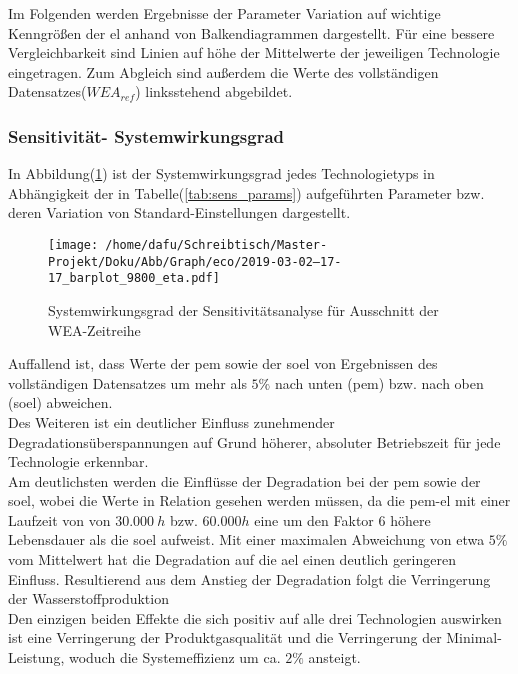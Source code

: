 \documentclass[onecolumn,10pt,titlepage]{article}
\begin{document}
Im Folgenden werden Ergebnisse der Parameter Variation auf wichtige Kenngrößen der \gls{el} anhand von Balkendiagrammen dargestellt. Für eine bessere Vergleichbarkeit sind Linien auf höhe der Mittelwerte der jeweiligen Technologie eingetragen.
Zum Abgleich sind außerdem die Werte des vollständigen Datensatzes($WEA_{ref}$) linksstehend abgebildet.

\newpage
\subsubsection{Sensitivität- Systemwirkungsgrad}
In Abbildung(\ref{fig:barplot_eco_9800_eta}) ist der Systemwirkungsgrad jedes Technologietyps in Abhängigkeit der in Tabelle(\ref{tab:sens_params}) aufgeführten Parameter bzw. deren Variation von Standard-Einstellungen dargestellt.\\


\begin{figure}[H]
	\centering
	\texttt{[image: /home/dafu/Schreibtisch/Master-Projekt/Doku/Abb/Graph/eco/2019-03-02--17-17\_barplot\_9800\_eta.pdf]}
	\caption[Systemwirkungsgrad Sensitivitätsanalyse]{Systemwirkungsgrad der Sensitivitätsanalyse für Ausschnitt der WEA-Zeitreihe}
	\label{fig:barplot_eco_9800_eta} 
\end{figure}
Auffallend ist, dass Werte der \gls{pem} sowie der \gls{soel} von Ergebnissen des vollständigen Datensatzes um mehr als $5\%$ nach unten (\gls{pem}) bzw. nach oben (\gls{soel}) abweichen.\\ Des Weiteren ist ein deutlicher Einfluss zunehmender Degradationsüberspannungen auf Grund höherer, absoluter Betriebszeit für jede Technologie erkennbar.\\
Am deutlichsten werden die Einflüsse der Degradation bei der \gls{pem} sowie der \gls{soel}, wobei die Werte in Relation gesehen werden müssen, da die \gls{pem}-\gls{el} mit einer Laufzeit von von $30.000~h$ bzw. $60.000h$ eine um den Faktor 6 höhere Lebensdauer als die \gls{soel} aufweist. Mit einer maximalen Abweichung von etwa $5\%$ vom Mittelwert hat die Degradation auf die \gls{ael} einen deutlich geringeren Einfluss. Resultierend aus dem Anstieg der Degradation folgt die Verringerung der Wasserstoffproduktion\\
Den einzigen beiden Effekte die sich positiv auf alle drei Technologien auswirken ist eine Verringerung der Produktgasqualität und die Verringerung der Minimal-Leistung, woduch die Systemeffizienz um ca. $2\%$ ansteigt.
\end{document}
